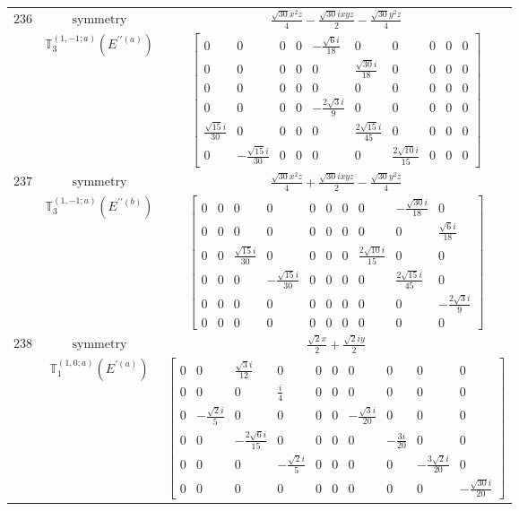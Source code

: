 \documentclass[fleqn,8pt,landscape]{jsarticle}
\begin{document}
\begin{longtable}{ccc}
$ 236 $ & $ \text{symmetry} $ & $ \frac{\sqrt{30} x^{2} z}{4} - \frac{\sqrt{30} i x y z}{2} - \frac{\sqrt{30} y^{2} z}{4} $ \\
$  $ & $ \mathbb{T}_{3}^{(1,-1;a)}(E^{\prime\prime(a)}) $ & $ \begin{bmatrix} 0 & 0 & 0 & 0 & - \frac{\sqrt{6} i}{18} & 0 & 0 & 0 & 0 & 0 \\ 0 & 0 & 0 & 0 & 0 & \frac{\sqrt{30} i}{18} & 0 & 0 & 0 & 0 \\ 0 & 0 & 0 & 0 & 0 & 0 & 0 & 0 & 0 & 0 \\ 0 & 0 & 0 & 0 & - \frac{2 \sqrt{3} i}{9} & 0 & 0 & 0 & 0 & 0 \\ \frac{\sqrt{15} i}{30} & 0 & 0 & 0 & 0 & \frac{2 \sqrt{15} i}{45} & 0 & 0 & 0 & 0 \\ 0 & - \frac{\sqrt{15} i}{30} & 0 & 0 & 0 & 0 & \frac{2 \sqrt{10} i}{15} & 0 & 0 & 0 \end{bmatrix} $ \\ \hline
$ 237 $ & $ \text{symmetry} $ & $ \frac{\sqrt{30} x^{2} z}{4} + \frac{\sqrt{30} i x y z}{2} - \frac{\sqrt{30} y^{2} z}{4} $ \\
$  $ & $ \mathbb{T}_{3}^{(1,-1;a)}(E^{\prime\prime(b)}) $ & $ \begin{bmatrix} 0 & 0 & 0 & 0 & 0 & 0 & 0 & 0 & - \frac{\sqrt{30} i}{18} & 0 \\ 0 & 0 & 0 & 0 & 0 & 0 & 0 & 0 & 0 & \frac{\sqrt{6} i}{18} \\ 0 & 0 & \frac{\sqrt{15} i}{30} & 0 & 0 & 0 & 0 & \frac{2 \sqrt{10} i}{15} & 0 & 0 \\ 0 & 0 & 0 & - \frac{\sqrt{15} i}{30} & 0 & 0 & 0 & 0 & \frac{2 \sqrt{15} i}{45} & 0 \\ 0 & 0 & 0 & 0 & 0 & 0 & 0 & 0 & 0 & - \frac{2 \sqrt{3} i}{9} \\ 0 & 0 & 0 & 0 & 0 & 0 & 0 & 0 & 0 & 0 \end{bmatrix} $ \\ \hline
$ 238 $ & $ \text{symmetry} $ & $ \frac{\sqrt{2} x}{2} + \frac{\sqrt{2} i y}{2} $ \\
$  $ & $ \mathbb{T}_{1}^{(1,0;a)}(E^{\prime(a)}) $ & $ \begin{bmatrix} 0 & 0 & \frac{\sqrt{3} i}{12} & 0 & 0 & 0 & 0 & 0 & 0 & 0 \\ 0 & 0 & 0 & \frac{i}{4} & 0 & 0 & 0 & 0 & 0 & 0 \\ 0 & - \frac{\sqrt{2} i}{5} & 0 & 0 & 0 & 0 & - \frac{\sqrt{3} i}{20} & 0 & 0 & 0 \\ 0 & 0 & - \frac{2 \sqrt{6} i}{15} & 0 & 0 & 0 & 0 & - \frac{3 i}{20} & 0 & 0 \\ 0 & 0 & 0 & - \frac{\sqrt{2} i}{5} & 0 & 0 & 0 & 0 & - \frac{3 \sqrt{2} i}{20} & 0 \\ 0 & 0 & 0 & 0 & 0 & 0 & 0 & 0 & 0 & - \frac{\sqrt{30} i}{20} \end{bmatrix} $ \\ \hline

\end{longtable}
\end{document}
